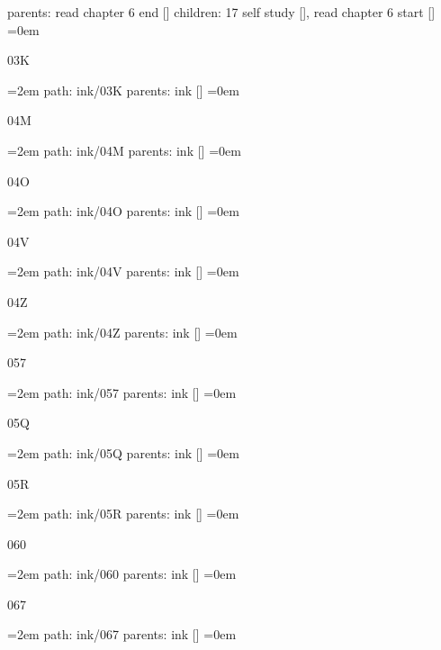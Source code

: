 \smallskip
parents:  read chapter 6 end []
\smallskip
children: 17 self study [], read chapter 6 start []
\smallskip
\leftskip=0em
\par\endgroup
\bigskip
{}
03K
\smallskip
\par\begingroup
\leftskip=2em
path: ink/03K
\smallskip
parents:  ink []
\smallskip
\leftskip=0em
\par\endgroup
\bigskip
{}
04M
\smallskip
\par\begingroup
\leftskip=2em
path: ink/04M
\smallskip
parents:  ink []
\smallskip
\leftskip=0em
\par\endgroup
\bigskip
{}
04O
\smallskip
\par\begingroup
\leftskip=2em
path: ink/04O
\smallskip
parents:  ink []
\smallskip
\leftskip=0em
\par\endgroup
\bigskip
{}
04V
\smallskip
\par\begingroup
\leftskip=2em
path: ink/04V
\smallskip
parents:  ink []
\smallskip
\leftskip=0em
\par\endgroup
\bigskip
{}
04Z
\smallskip
\par\begingroup
\leftskip=2em
path: ink/04Z
\smallskip
parents:  ink []
\smallskip
\leftskip=0em
\par\endgroup
\bigskip
{}
057
\smallskip
\par\begingroup
\leftskip=2em
path: ink/057
\smallskip
parents:  ink []
\smallskip
\leftskip=0em
\par\endgroup
\bigskip
{}
05Q
\smallskip
\par\begingroup
\leftskip=2em
path: ink/05Q
\smallskip
parents:  ink []
\smallskip
\leftskip=0em
\par\endgroup
\bigskip
{}
05R
\smallskip
\par\begingroup
\leftskip=2em
path: ink/05R
\smallskip
parents:  ink []
\smallskip
\leftskip=0em
\par\endgroup
\bigskip
{}
060
\smallskip
\par\begingroup
\leftskip=2em
path: ink/060
\smallskip
parents:  ink []
\smallskip
\leftskip=0em
\par\endgroup
\bigskip
{}
067
\smallskip
\par\begingroup
\leftskip=2em
path: ink/067
\smallskip
parents:  ink []
\smallskip
\leftskip=0em
\par\endgroup
\bigskip
{}
